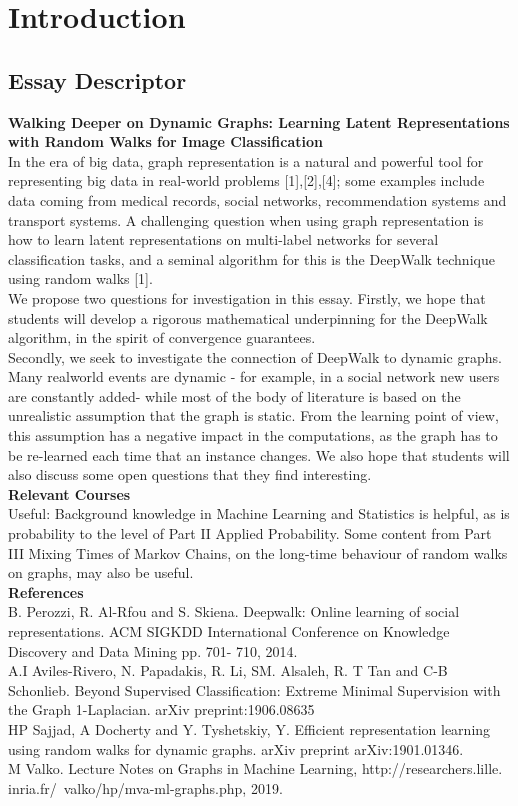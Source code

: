 \documentclass[a4paper]{article}
\begin{document}


\tableofcontents


\section{Introduction}
\subsection*{Essay Descriptor}
\textbf{Walking Deeper on Dynamic Graphs: Learning Latent Representations
with Random Walks for Image Classification}\\
In the era of big data, graph representation is a natural and powerful tool for representing big
data in real-world problems [1],[2],[4]; some examples include data coming from medical records,
social networks, recommendation systems and transport systems. A challenging question when
using graph representation is how to learn latent representations on multi-label networks for
several classification tasks, and a seminal algorithm for this is the DeepWalk technique using
random walks [1].\\
We propose two questions for investigation in this essay. Firstly, we hope that students will
develop a rigorous mathematical underpinning for the DeepWalk algorithm, in the spirit of
convergence guarantees.\\
Secondly, we seek to investigate the connection of DeepWalk to dynamic graphs. Many realworld events are dynamic - for example, in a social network new users are constantly added- while
most of the body of literature is based on the unrealistic assumption that the graph is static.
From the learning point of view, this assumption has a negative impact in the computations, as the graph has to be re-learned each time that an instance changes. We also hope that students
will also discuss some open questions that they find interesting.\\
\textbf{Relevant Courses}\\
Useful: Background knowledge in Machine Learning and Statistics is helpful, as is probability
to the level of Part II Applied Probability. Some content from Part III Mixing Times of Markov
Chains, on the long-time behaviour of random walks on graphs, may also be useful.\\
\textbf{References}\\
[1] B. Perozzi, R. Al-Rfou and S. Skiena. Deepwalk: Online learning of social representations.
ACM SIGKDD International Conference on Knowledge Discovery and Data Mining pp. 701-
710, 2014.\\
[2] A.I Aviles-Rivero, N. Papadakis, R. Li, SM. Alsaleh, R. T Tan and C-B Schonlieb. Beyond
Supervised Classification: Extreme Minimal Supervision with the Graph 1-Laplacian. arXiv
preprint:1906.08635\\
[3] HP Sajjad, A Docherty and Y. Tyshetskiy, Y. Efficient representation learning using random
walks for dynamic graphs. arXiv preprint arXiv:1901.01346.\\
[4] M Valko. Lecture Notes on Graphs in Machine Learning, http://researchers.lille.
inria.fr/~valko/hp/mva-ml-graphs.php, 2019.\\
\end{document}
